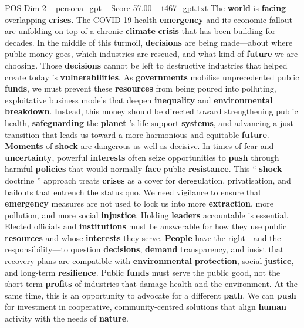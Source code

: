 \begin{textsample}{POS Dim 2 – persona\_gpt – Score 57.00 – t467\_gpt.txt}  \label{ex:f2_pos_017}
The \textbf{world} is \textbf{facing} overlapping \textbf{crises}.
The COVID-19 health \textbf{emergency} and its economic fallout are unfolding on top of a chronic \textbf{climate} \textbf{crisis} that has been building for decades.
In the middle of this turmoil, \textbf{decisions} are being made—about where public money goes, which industries are rescued, and what kind of \textbf{future} we are choosing.
Those \textbf{decisions} cannot be left to destructive industries that helped create today ’s \textbf{vulnerabilities}.
As \textbf{governments} mobilise unprecedented public \textbf{funds}, we must prevent these \textbf{resources} from being poured into polluting, exploitative business models that deepen \textbf{inequality} and \textbf{environmental} \textbf{breakdown}.
Instead, this money should be directed toward strengthening public health, \textbf{safeguarding} the \textbf{planet} ’s life-support \textbf{systems}, and advancing a just transition that leads us toward a more harmonious and equitable \textbf{future}. \textbf{Moments} of \textbf{shock} are dangerous as well as decisive.
In times of fear and \textbf{uncertainty}, powerful \textbf{interests} often seize opportunities to \textbf{push} through harmful \textbf{policies} that would normally \textbf{face} public \textbf{resistance}.
This “ \textbf{shock} doctrine ” approach treats \textbf{crises} as a cover for deregulation, privatisation, and bailouts that entrench the status quo.
We need vigilance to ensure that \textbf{emergency} measures are not used to lock us into more \textbf{extraction}, more pollution, and more social \textbf{injustice}.
Holding \textbf{leaders} accountable is essential.
Elected officials and \textbf{institutions} must be answerable for how they use public \textbf{resources} and whose \textbf{interests} they serve. \textbf{People} have the right—and the responsibility—to question \textbf{decisions}, \textbf{demand} transparency, and insist that recovery plans are compatible with \textbf{environmental} \textbf{protection}, social \textbf{justice}, and long-term \textbf{resilience}.
Public \textbf{funds} must serve the public good, not the short-term \textbf{profits} of industries that damage health and the environment.
At the same time, this is an opportunity to advocate for a different \textbf{path}.
We can \textbf{push} for investment in cooperative, community-centred solutions that align \textbf{human} activity with the needs of \textbf{nature}.

\end{textsample}
